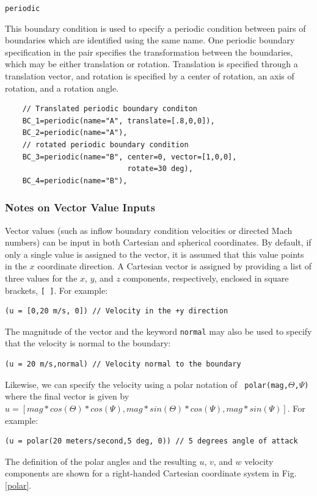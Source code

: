\documentclass{article}
\begin{document}
\begin{list}{}{}
  \item {\tt periodic}

    This boundary condition is used to specify a periodic condition
    between pairs of boundaries which are identified using the same
    name.  One periodic boundary specification in the pair specifies the
    transformation between the boundaries, which may be either
    translation or rotation.  Translation is specified through a
    translation vector, and rotation is specified by a center of rotation,
    an axis of rotation, and a rotation angle.

\begin{verbatim}
    // Translated periodic boundary conditon
    BC_1=periodic(name="A", translate=[.8,0,0]),
    BC_2=periodic(name="A"),
    // rotated periodic boundary condition
    BC_3=periodic(name="B", center=0, vector=[1,0,0], 
                            rotate=30 deg),
    BC_4=periodic(name="B"),
\end{verbatim}
\end{list}

\subsubsection{ Notes on Vector Value Inputs }

Vector values (such as inflow boundary condition velocities or directed Mach
numbers) can be input in both Cartesian and spherical coordinates.  By
default, if only a single value is assigned to the vector,
it is assumed that this value points in the $x$ coordinate
direction.  A Cartesian vector is assigned by providing a list of
three values for the $x$, $y$, and $z$ components, respectively, enclosed in square
brackets, {\tt [~]}.  For example:
\begin{verbatim}
(u = [0,20 m/s, 0]) // Velocity in the +y direction
\end{verbatim}
The magnitude of the vector and the keyword {\tt normal} may also
be used to specify that the velocity is normal to the boundary:
\begin{verbatim}
(u = 20 m/s,normal) // Velocity normal to the boundary
\end{verbatim}
Likewise, we can specify the velocity using a polar notation of {\tt
polar(mag,$\Theta$,$\Psi$)} where the final vector is given by $u =
\left[ mag*cos(\Theta)*cos(\Psi),mag*sin(\Theta)*cos(\Psi),mag*sin(\Psi)\right]$.
For example:
\begin{verbatim}
(u = polar(20 meters/second,5 deg, 0)) // 5 degrees angle of attack
\end{verbatim}
The definition of the polar angles and the resulting $u$, $v$, and $w$ velocity components are shown for a right-handed Cartesian coordinate system in Fig. \ref{polar}.
\end{document}
